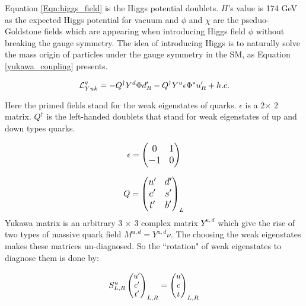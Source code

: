  Equation \ref{Eqn:higgs_field} is the Higgs potential doublets. $H$'s value is 174 GeV as the expected Higgs potential for vacuum and $\phi$ and $\chi$ are the pseduo-Goldstone fields which are appearing when introducing Higgs field  $\phi$ without breaking the gauge symmetry. The idea of introducing Higgs is to naturally solve the mass origin of particles under the gauge symmetry in the SM, as Equation  \ref{yukawa_coupling} presents. 

\begin{equation}{\label{yukawa_coupling}}
\large
\mathcal{L}_{Yuk}^q = 
-{Q}^\dag Y^d \Phi d_R^\prime 
-{Q}^\dag Y^u \epsilon \Phi^* u_R^\prime
+ h.c.
\end{equation}

Here the primed fields stand for the weak eigenstates of quarks. $\epsilon$ is a 2$\times$ 2 matrix. $Q^\dag$ is the left-handed doublets that stand for weak eigenstates of up and down types quarks. 

\begin{equation}
\large
\epsilon =  
\begin{pmatrix}
0 & 1\\
-1 & 0
\end{pmatrix}
\end{equation}

\begin{equation}
\large
Q =  
\begin{pmatrix}
u^\prime & d^\prime \\
c^\prime & s^\prime \\
t^\prime & b^\prime
\end{pmatrix}_L
\end{equation}
Yukawa matrix is an arbitrary 3 $\times$ 3 complex matrix $Y^{u,d}$ which give the rise of two types of massive quark field $M^{u,d}=Y^{u,d}\nu$. The choosing the weak eigenstates makes these matrices un-diagnosed. So the ``rotation" of weak eigenstates to diagnose them is done by:

\begin{equation}\label{rot1}
\small
S_{L,R}^{u}
\begin{pmatrix}
u^\prime   \\
c^\prime  \\
t^\prime 
\end{pmatrix}_{L,R}
= \begin{pmatrix}
u  \\
c  \\
t 
\end{pmatrix}_{L,R}
\end{equation}

